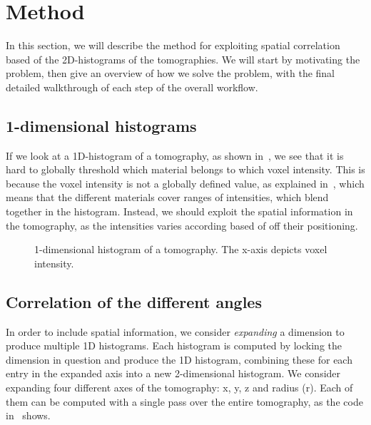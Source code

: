 \section{Method}\label{sec:method}
In this section, we will describe the method for exploiting spatial correlation based of the 2D-histograms of the tomographies.
We will start by motivating the problem, then give an overview of how we solve the problem, with the final detailed walkthrough of each step of the overall workflow.

\subsection{1-dimensional histograms}
If we look at a 1D-histogram of a tomography, as shown in~, we see that it is hard to globally threshold which material belongs to which voxel intensity.
This is because the voxel intensity is not a globally defined value, as explained in~, which means that the different materials cover ranges of intensities, which blend together in the histogram.
Instead, we should exploit the spatial information in the tomography, as the intensities varies according based of off their positioning.

\begin{figure}
    \centering
    \caption{1-dimensional histogram of a tomography. The x-axis depicts voxel intensity.}
    \label{fig:1d-hist}
\end{figure}

\subsection{Correlation of the different angles}
In order to include spatial information, we consider \textit{expanding} a dimension to produce multiple 1D histograms.
Each histogram is computed by locking the dimension in question and produce the 1D histogram, combining these for each entry in the expanded axis into a new 2-dimensional histogram.
We consider expanding four different axes of the tomography: x, y, z and radius (r).
Each of them can be computed with a single pass over the entire tomography, as the code in~ shows.


